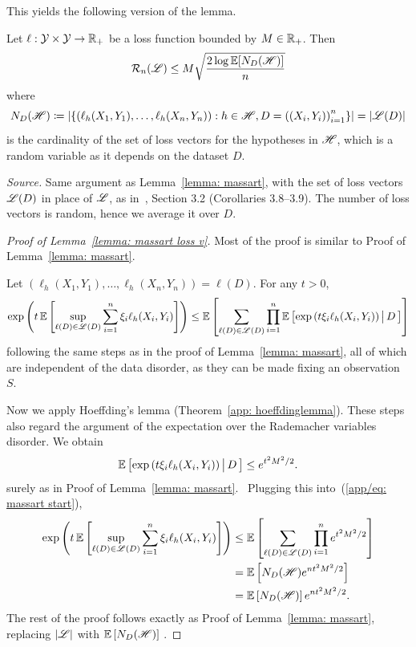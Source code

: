 \documentclass[reqno]{amsart}
\begin{document}
This yields the following version of the lemma. 
\begin{lemma}\label{lemma: massart loss v}
Let $\ell:\mathcal{Y}\times\mathcal{Y}\to\mathbb{R}_+$ be a loss function bounded by $M\in\mathbb{R}_+$. Then
\[
\mathcal R_n(\mathscr{L}) \le M\sqrt{\frac{2\log \mathbb{E}[N_D(\mathscr{H})]}{n}}
\]
where \[N_D(\mathscr{H})\coloneq \left\vert\left\{\left(\ell_h(X_1,Y_1),\ldots,\ell_h(X_n,Y_n)\right) : h\in\mathscr{H}, D = {((X_i, Y_i))}_{i=1}^n\right\}\right\vert = \left\vert \mathscr{L}(D)\right\vert\] is the cardinality of the set of loss vectors for the hypotheses in $\mathscr{H}$, which is a random variable as it depends on the dataset $D$.

\textnormal{\emph{Source.} Same argument as Lemma~\ref{lemma: massart}, with the set of loss vectors $\mathscr{L}(D)$ in place of $\mathscr{L}$, as in~\cite{mohri2018foundations}, Section 3.2 (Corollaries 3.8--3.9). The number of loss vectors is random, hence we average it over $D$.}

\begin{proof}[Proof of Lemma~\ref{lemma: massart loss v}]
Most of the proof is similar to Proof of Lemma~\ref{lemma: massart}. 

Let $(\ell_h(X_1,Y_1),\ldots,\ell_h(X_n,Y_n)) = \ell(D)$. For any $t>0$, 
\[
\exp\left(t\,\mathbb{E}\left[\sup_{\ell(D) \in \mathscr{L}(D)}\sum_{i=1}^n \xi_i\ell_h(X_i,Y_i)\right]\right)\le
\mathbb{E}\left[\sum_{\ell(D)\in\mathscr{L}(D)}\prod_{i=1}^n \mathbb{E}\left[\exp\left(t\xi_i\ell_h(X_i,Y_i)\right)\big\vert\,D\,\right]\right]
\]
following the same steps as in the proof of Lemma~\ref{lemma: massart}, all of which are independent of the data disorder, as they can be made fixing an observation $S$. 

Now we apply Hoeffding's lemma (Theorem~\ref{app: hoeffdinglemma}). These steps also regard the argument of the expectation over the Rademacher variables disorder. We obtain
\[
\mathbb{E}\left[\exp\left(t\xi_i\ell_h(X_i,Y_i)\right)\big\vert\,D\,\right] \le e^{t^2M^2/2}.
\]
surely as in Proof of Lemma~\ref{lemma: massart}. 
Plugging this into~(\ref{app/eq: massart start}),
\begin{align*}
\exp\left(t\,\mathbb{E}\left[\sup_{\ell(D)\in\mathscr{L}(D)}\sum_{i=1}^n \xi_i\ell_h(X_i,Y_i)\right]\right) &\le \mathbb{E}\left[\sum_{\ell(D)\in\mathscr{L}(D)}\prod_{i=1}^n e^{t^2M^2/2}\right]\\ &= \mathbb{E}\left[N_D(\mathscr{H})e^{nt^2M^2/2}\right] \\&= \mathbb{E}\left[N_D(\mathscr{H})\right] e^{nt^2M^2/2}.
\end{align*}
The rest of the proof follows exactly as Proof of Lemma~\ref{lemma: massart}, replacing $\vert\mathscr{L}\vert$ with $\mathbb{E}\left[N_D(\mathscr{H})\right]$ .
\end{proof}
\end{lemma}
\end{document}
